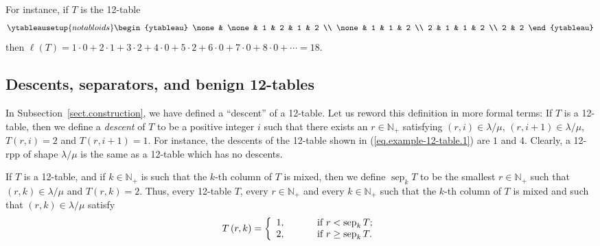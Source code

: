\documentclass[numbers=enddot,12pt,final,onecolumn,notitlepage]{scrartcl}%
\theoremstyle{definition}
\def\lm{{\lambda/\mu}}
\begin{document}
For instance, if $T$ is the 12-table
\begin{equation}
%
\ytableausetup{notabloids}
\begin{ytableau}
\none& \none& 1 & 2 & 1 & 2 \\
\none& 1 & 1 & 2 \\
2 & 1 & 1 & 2 \\
2 & 2
\end{ytableau}%
\label{eq.example-12-table.1}
\end{equation}
then $\ell\left(  T\right)  =1\cdot0+2\cdot1+3\cdot2+4\cdot0+5\cdot
2+6\cdot0+7\cdot0+8\cdot0+\cdots=18$.

\subsection{\label{subsection:benign}Descents, separators, and benign 12-tables}

In Subsection~\ref{sect.construction}, we have defined a ``descent''
of a 12-table. Let us reword this definition in more formal terms:
If $T$ is a 12-table, then we define a \textit{descent} of $T$ to be a
positive integer $i$ such that there exists an $r\in\mathbb{N}_{+}$ satisfying
$\left(  r,i\right)  \in \lm$, $\left(  r,i+1\right)  \in \lm$, $T\left(
r,i\right)  =2$ and $T\left(  r,i+1\right)  =1$. For instance,
the descents of the 12-table shown in (\ref{eq.example-12-table.1})
are $1$ and $4$. Clearly, a 12-rpp of shape $\lm$ is the same as a 12-table which has no
descents.

If $T$ is a 12-table, and if $k\in\mathbb{N}_{+}$ is such that the $k$-th
column of $T$ is mixed, then we define $\operatorname*{sep}\nolimits_{k}T$ to
be the smallest $r\in\mathbb{N}_{+}$ such that $\left(  r,k\right)  \in \lm$ and
$T\left(  r,k\right)  =2$. Thus, every 12-table $T$, every
$r\in\mathbb{N}_{+}$ and every $k\in\mathbb{N}_{+}$ such that the $k$-th
column of $T$ is mixed and such that $\left(  r,k\right)  \in \lm$ satisfy%
\begin{equation}
T\left(  r,k\right)  =\left\{
\begin{array}
[c]{l}%
1,\ \ \ \ \ \ \ \ \ \ \text{if }r<\operatorname*{sep}\nolimits_{k}T;\\
2,\ \ \ \ \ \ \ \ \ \ \text{if }r\geq\operatorname*{sep}\nolimits_{k}T.
\end{array}
\right.  \label{pf.lem.BK.Tsep}%
\end{equation}
\end{document}
